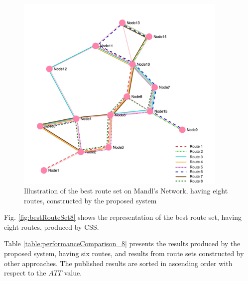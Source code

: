 \begin{figure}[H]
    \begin{center}
    \includegraphics[width=4in]{assets/mandlnetwork_8routes.png}
    \end{center}
    \caption{Illustration of the best route set on Mandl's Network, having eight routes, constructed by the proposed system}
    \label{fig:bestRouteSet8} 
\end{figure}

Fig. \vref{fig:bestRouteSet8} shows the representation of the best route set, having eight routes, produced by CSS.

Table \vref{table:performanceComparison_8} presents the results produced by the proposed system, having six routes, and results from route sets constructed by other approaches. The published results are sorted in ascending order with respect to the $ATT$ value.

